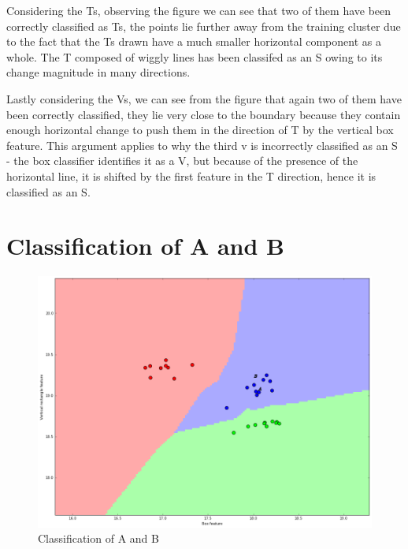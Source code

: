 \documentclass[a4paper,12px,twocolumn]{article}
\begin{document}
\begin{flushleft}
{        \smallskip

        Considering the Ts, observing the figure we can see that two of them have been correctly classified as Ts, the points lie further
        away from the training cluster due to the fact that the Ts drawn have a much smaller horizontal component as a whole. The T composed
        of wiggly lines has been classifed as an S owing to its change magnitude in many directions.

        \smallskip
        Lastly considering the Vs, we can see from the figure that again two of them have been correctly classified, they lie very close
        to the boundary because they contain enough horizontal change to push them in the direction of T by the vertical box feature. This argument
        applies to why the third v is incorrectly classified as an S - the box classifier identifies it as a V, but because of the presence of
        the horizontal line, it is shifted by the first feature in the T direction, hence it is classified as an S.


    }






\section{Classification of A and B}



\begin{figure}[h!]
  \caption{Classification of A and B}
  \includegraphics[scale=0.25]{AB}
\end{figure}


\end{flushleft}
\end{document}
